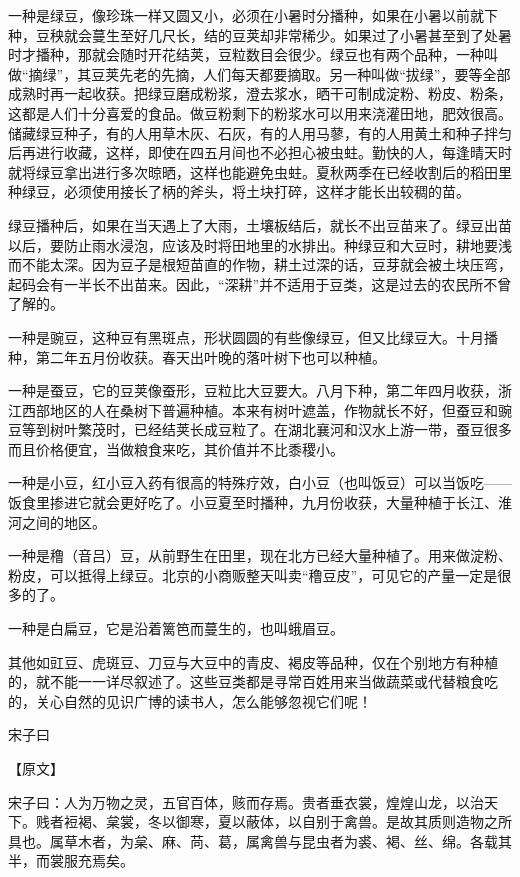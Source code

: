 \documentclass[12pt,UTF8]{ctexbook}
\begin{document}
一种是绿豆，像珍珠一样又圆又小，必须在小暑时分播种，如果在小暑以前就下种，豆秧就会蔓生至好几尺长，结的豆荚却非常稀少。如果过了小暑甚至到了处暑时才播种，那就会随时开花结荚，豆粒数目会很少。绿豆也有两个品种，一种叫做“摘绿”，其豆荚先老的先摘，人们每天都要摘取。另一种叫做“拔绿”，要等全部成熟时再一起收获。把绿豆磨成粉浆，澄去浆水，晒干可制成淀粉、粉皮、粉条，这都是人们十分喜爱的食品。做豆粉剩下的粉浆水可以用来浇灌田地，肥效很高。储藏绿豆种子，有的人用草木灰、石灰，有的人用马蓼，有的人用黄土和种子拌匀后再进行收藏，这样，即使在四五月间也不必担心被虫蛀。勤快的人，每逢晴天时就将绿豆拿出进行多次晾晒，这样也能避免虫蛀。夏秋两季在已经收割后的稻田里种绿豆，必须使用接长了柄的斧头，将土块打碎，这样才能长出较稠的苗。

绿豆播种后，如果在当天遇上了大雨，土壤板结后，就长不出豆苗来了。绿豆出苗以后，要防止雨水浸泡，应该及时将田地里的水排出。种绿豆和大豆时，耕地要浅而不能太深。因为豆子是根短苗直的作物，耕土过深的话，豆芽就会被土块压弯，起码会有一半长不出苗来。因此，“深耕”并不适用于豆类，这是过去的农民所不曾了解的。

一种是豌豆，这种豆有黑斑点，形状圆圆的有些像绿豆，但又比绿豆大。十月播种，第二年五月份收获。春天出叶晚的落叶树下也可以种植。

一种是蚕豆，它的豆荚像蚕形，豆粒比大豆要大。八月下种，第二年四月收获，浙江西部地区的人在桑树下普遍种植。本来有树叶遮盖，作物就长不好，但蚕豆和豌豆等到树叶繁茂时，已经结荚长成豆粒了。在湖北襄河和汉水上游一带，蚕豆很多而且价格便宜，当做粮食来吃，其价值并不比黍稷小。

一种是小豆，红小豆入药有很高的特殊疗效，白小豆（也叫饭豆）可以当饭吃——饭食里掺进它就会更好吃了。小豆夏至时播种，九月份收获，大量种植于长江、淮河之间的地区。

一种是穞（音吕）豆，从前野生在田里，现在北方已经大量种植了。用来做淀粉、粉皮，可以抵得上绿豆。北京的小商贩整天叫卖“穞豆皮”，可见它的产量一定是很多的了。

一种是白扁豆，它是沿着篱笆而蔓生的，也叫蛾眉豆。

其他如豇豆、虎斑豆、刀豆与大豆中的青皮、褐皮等品种，仅在个别地方有种植的，就不能一一详尽叙述了。这些豆类都是寻常百姓用来当做蔬菜或代替粮食吃的，关心自然的见识广博的读书人，怎么能够忽视它们呢！

宋子曰

【原文】

宋子曰：人为万物之灵，五官百体，赅而存焉。贵者垂衣裳，煌煌山龙，以治天下。贱者裋褐、枲裳，冬以御寒，夏以蔽体，以自别于禽兽。是故其质则造物之所具也。属草木者，为枲、麻、苘、葛，属禽兽与昆虫者为裘、褐、丝、绵。各载其半，而裳服充焉矣。
\end{document}
